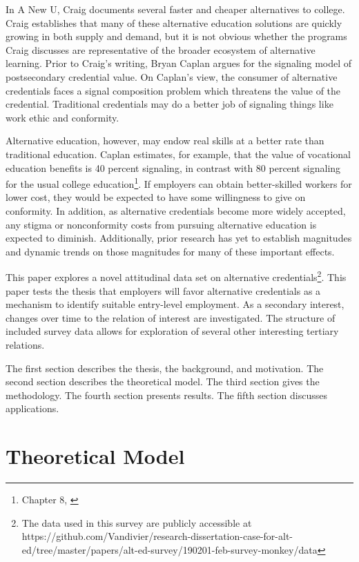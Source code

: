 \documentclass[AER]{./aea-latex-templates/AEA}
\begin{document}
In A New U, Craig documents several faster and cheaper alternatives to
college\cite{craig_2018}. Craig establishes that many of these alternative education
solutions are quickly growing in both supply and demand, but it is not
obvious whether the programs Craig discusses are representative of the
broader ecosystem of alternative learning. Prior to Craig’s writing, Bryan
Caplan argues for the signaling model of postsecondary credential value\cite{caplan2018case}.
On Caplan’s view, the consumer of alternative credentials faces a signal
composition problem which threatens the value of the credential.
Traditional credentials may do a better job of signaling things like work
ethic and conformity.

Alternative education, however, may endow real skills at a better rate
than traditional education. Caplan estimates, for example, that the value
of vocational education benefits is 40 percent signaling, in contrast with 80 percent
signaling for the usual college education\footnote{Chapter 8, \cite{caplan2018case}}. If employers can obtain
better-skilled workers for lower cost, they would be expected to have some
willingness to give on conformity. In addition, as alternative credentials
become more widely accepted, any stigma or nonconformity costs from
pursuing alternative education is expected to diminish. Additionally,
prior research has yet to establish magnitudes and dynamic trends on those
magnitudes for many of these important effects.

This paper explores a novel attitudinal data set on alternative
credentials\footnote{ The data used in this survey are publicly accessible
at https://github.com/Vandivier/research-dissertation-case-for-alt-ed/tree/master/papers/alt-ed-survey/190201-feb-survey-monkey/data}.
This paper tests the thesis that employers will favor
alternative credentials as a mechanism to identify suitable entry-level
employment. As a secondary interest, changes over time to the relation of
interest are investigated. The structure of included survey data allows
for exploration of several other interesting tertiary relations.

The first section describes the thesis, the background, and motivation. The
second section describes the theoretical model. The third section gives the
methodology. The fourth section presents results. The fifth section
discusses applications.

\section{Theoretical Model}
\end{document}

